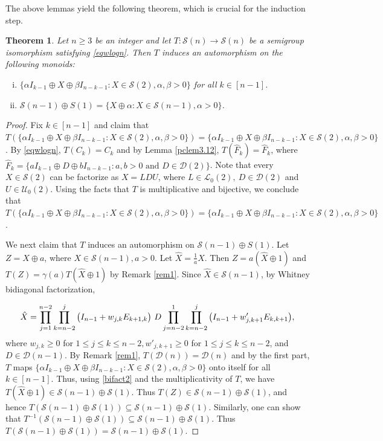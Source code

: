 \documentclass[11pt,reqno]{amsart}
\theoremstyle{plain}
\newtheorem{theorem}{Theorem}[section]
\theoremstyle{definition}
\numberwithin{equation}{section}
\def\cS{\mathcal S}
\def\cD{\mathcal D}
\def\cU{\mathcal U}
\def\cL{\mathcal L}
\begin{document}
The above lemmas yield the following theorem, which is crucial for the induction step.
\begin{theorem}\label{remgen}
	Let $n\geq3$ be an integer and let $T:\cS(n) \to \cS(n)$ be a semigroup isomorphism satisfying \eqref{eqwlogn}.  Then $T$ induces an automorphism on the following monoids:  %
	\begin{enumerate}[(i)]
		\item   $\{\alpha I_{k-1}\oplus X \oplus \beta I_{n-k-1}: X\in \cS(2), \alpha, \beta>0\}$ for all $k\in[n-1]$.
		\item $\cS(n-1)\oplus S(1)=\{X \oplus \alpha : X \in \cS(n-1), \alpha> 0\}$.
	\end{enumerate}
\end{theorem}
\begin{proof}
Fix $k\in[n-1]$ and claim that $T(\{\alpha I_{k-1}\oplus X \oplus \beta I_{n-k-1}: X\in \cS(2), \alpha, \beta>0\})=\{\alpha I_{k-1}\oplus X \oplus \beta I_{n-k-1}: X\in \cS(2), \alpha, \beta>0\}$. By \eqref{eqwlogn}, $T(C_{k})=C_{k}$  and by Lemma \ref{pclem3.12}, $T(\hat F_{k})=\hat F_{k}$, where $\hat F_{k}=\{aI_{k-1}\oplus D\oplus bI_{n-k-1}: a,b>0 \text{ and } D\in \cD(2)\}$. Note that every $X\in \cS(2)$ can be factorize as $X=LDU$, where $L \in \cL_0(2),~D\in \cD(2)$ and $U\in \cU_0(2)$. Using the facts that $T$ is multiplicative and bijective, we conclude that $T(\{\alpha I_{k-1}\oplus X \oplus \beta I_{n-k-1}: X\in \cS(2), \alpha, \beta>0\})=\{\alpha I_{k-1}\oplus X \oplus \beta I_{n-k-1}: X\in \cS(2), \alpha, \beta>0\}$. 

 We next claim that  $T$  induces an automorphism on $\cS(n-1)\oplus S(1)$. Let $Z=X\oplus a$, where $X \in \cS(n-1), a> 0$. Let $\hat X=\frac{1}{a}X$. Then $Z=a(\hat X\oplus 1)$ and $T(Z)=\gamma(a)T(\hat X\oplus 1)$ by Remark \ref{rem1}. Since $\hat X\in \cS(n-1)$, by Whitney bidiagonal factorization, 

	\begin{equation}\label{bifact2}
	\hat X=\prod_{j=1}^{n-2} \prod_{k=n-2}^{j} \big{(} I_{n-1}+w_{j,k}E_{k+1,k} \big{)}~D \prod_{j=n-2}^{1} \prod_{k=n-2}^{j} \big{(} I_{n-1}+ w'_{j,k+1}E_{k,k+1} \big{)},
\end{equation}
where  $w_{j,k}\geq 0$ for $1\leq j\leq k \leq n-2,  w'_{j,k+1}\geq 0$ for $1\leq j\leq k\leq n-2$, and $D\in \cD(n-1)$. By Remark \ref{rem1}, $T(\cD{(n)})=\cD(n)$ and by the first part, $T$ maps $\{\alpha I_{k-1}\oplus X \oplus \beta I_{n-k-1}: X\in \cS(2), \alpha, \beta>0\}$ onto itself for all $k\in[n-1]$. Thus, using \eqref{bifact2} and the multiplicativity of $T$, we have $T(\hat X\oplus 1)\in \cS(n-1)\oplus \cS(1)$. Thus $T(Z) \in \cS(n-1)\oplus \cS(1)$, and hence  $T(\cS(n-1)\oplus \cS(1)) \subseteq \cS(n-1)\oplus \cS(1)$. Similarly, one can show that $T^{-1}(\cS(n-1)\oplus \cS(1)) \subseteq \cS(n-1)\oplus \cS(1)$. Thus $T(\cS(n-1)\oplus \cS(1)) = \cS(n-1)\oplus \cS(1)$.
\end{proof}
\end{document}
